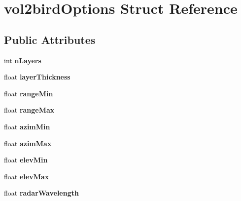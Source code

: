 \hypertarget{structvol2birdOptions}{}\section{vol2bird\+Options Struct Reference}
\label{structvol2birdOptions}
\subsection*{Public Attributes}
\begin{DoxyCompactItemize}
\item 
\mbox{\label{structvol2birdOptions_a29e8da62035c5b4f51e35905fc89e48b}} 
int {\bfseries n\+Layers}
\item 
\mbox{\label{structvol2birdOptions_adf146bca4bf37e70582787b273030570}} 
float {\bfseries layer\+Thickness}
\item 
\mbox{\label{structvol2birdOptions_a1ea3c05474b30c6a6442ddcbc0b8fe23}} 
float {\bfseries range\+Min}
\item 
\mbox{\label{structvol2birdOptions_ac4681a1bd41caf4eec9677b7725f46bb}} 
float {\bfseries range\+Max}
\item 
\mbox{\label{structvol2birdOptions_aafcad1fae2a104c3a969f662ac366738}} 
float {\bfseries azim\+Min}
\item 
\mbox{\label{structvol2birdOptions_a49c232f0b2cbdbd9a03fab4ef1b54745}} 
float {\bfseries azim\+Max}
\item 
\mbox{\label{structvol2birdOptions_a443eac800837c6b3e5f2fa6fcbe6fa1d}} 
float {\bfseries elev\+Min}
\item 
\mbox{\label{structvol2birdOptions_af48341f75ab36befc4486562023742e3}} 
float {\bfseries elev\+Max}
\item 
\mbox{\label{structvol2birdOptions_a88c8f432a386e2c26c1d02cbf38b4fef}} 
float {\bfseries radar\+Wavelength}
\item 
\mbox{\label{structvol2birdOptions_ab53e14414d3369e7c7d822746044b36b}} 

\end{DoxyCompactItemize}
